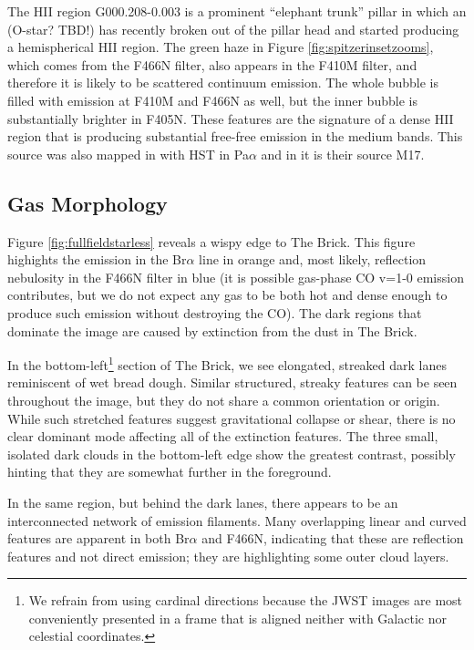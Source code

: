 The HII region G000.208-0.003 is a prominent ``elephant trunk'' pillar in which an (O-star?  TBD!) has recently broken out of the pillar head and started producing a hemispherical HII region.
The green haze in Figure \ref{fig:spitzerinsetzooms}, which comes from the F466N filter, also appears in the F410M filter, and therefore it is likely to be scattered continuum emission.
The whole bubble is filled with emission at F410M and F466N as well, but the inner bubble is substantially brighter in F405N.
These features are the signature of a dense HII region that is producing substantial free-free emission in the medium bands.
This source was also mapped in \citet{Wang2010} with HST in Pa$\alpha$ and in \citet{Lu2019a} it is their source M17.
 \subsection{Gas Morphology}
 Figure \ref{fig:fullfieldstarless} reveals a wispy edge to The Brick.
 This figure highights the emission in the Br$\alpha$ line in orange and, most likely, reflection nebulosity in the F466N filter in blue (it is possible gas-phase CO v=1-0 emission contributes, but we do not expect any gas to be both hot and dense enough to produce such emission without destroying the CO).
 The dark regions that dominate the image are caused by extinction from the dust in The Brick.
 
 In the bottom-left\footnote{We refrain from using cardinal directions because the JWST images are most conveniently presented in a frame that is aligned neither with Galactic nor celestial coordinates.} section of The Brick, we see elongated, streaked dark lanes reminiscent of wet bread dough.
 Similar structured, streaky features can be seen throughout the image, but they do not share a common orientation or origin.
 While such stretched features suggest gravitational collapse or shear, there is no clear dominant mode affecting all of the extinction features.
 The three small, isolated dark clouds in the bottom-left edge show the greatest contrast, possibly hinting that they are somewhat further in the foreground.

 In the same region, but behind the dark lanes, there appears to be an interconnected network of emission filaments.
 Many overlapping linear and curved features are apparent in both Br$\alpha$ and F466N, indicating that these are reflection features and not direct emission; they are highlighting some outer cloud layers.


